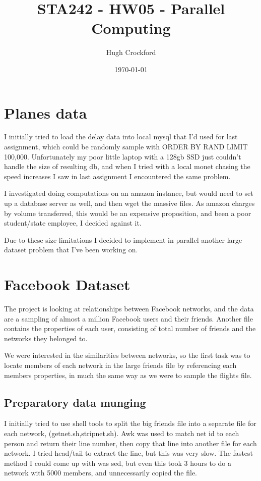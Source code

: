 \documentclass[12pt]{article}
\title{STA242 - HW05 - Parallel Computing}
\author{Hugh Crockford}
\date{\today}
\begin{document}
	\maketitle
	\section{Planes data}
		I initially tried to load the delay data into local mysql that I'd used for last assignment, which could be randomly sample with ORDER BY RAND LIMIT 100,000.
		Unfortunately my poor little laptop with a 128gb SSD just couldn't handle the size of resulting db, and when I tried with a local monet chasing the speed increases I saw in last assignment I encountered the same problem.


		I investigated doing computations on an amazon instance, but would need to set up a database server as well, and then wget the massive files. 
		As amazon charges by volume transferred, this would be an expensive proposition, and been a poor student/state employee, I decided against it.


		Due to these size limitations I decided to implement in parallel another large dataset problem that I've been working on.
	\section{Facebook Dataset}

		The project is looking at relationships between Facebook networks, and the data are a sampling of almost a million Facebook users and their friends.
		Another file contains the properties of each user, consisting of total number of friends and the networks they belonged to.


		We were interested in the similarities between networks, so the first task was to locate members of each network in the large friends file by referencing each members properties, in much the same way as we were to sample the flights file.
		
		\subsection{Preparatory data munging}
		I initially tried to use shell tools to split the big friends file into a separate file for each network, (getnet.sh,stripnet.sh).
		Awk was used to match net id to each person and return their line number, then copy that line into another file for each network. 
		I tried head/tail to extract the line, but this was very slow. The fastest method I could come up with was sed, but even this took 3 hours to do a network with 5000 members, and unnecessarily copied the file.
\end{document}
